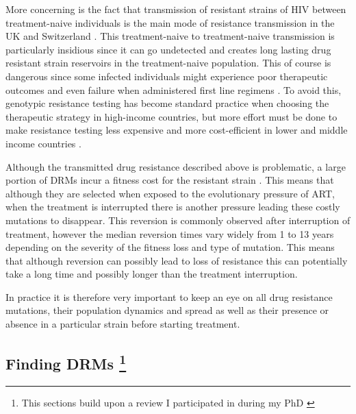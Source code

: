 \documentclass[
  11pt,
  twoside,
  BCOR=10mm,
  listof=totoc]{scrbook}
\begin{document}
More concerning is the fact that transmission of resistant strains of HIV between treatment-naive individuals is the main mode of resistance transmission in the UK \autocite{mouradPhylotypebasedAnalysisHighlights2015,hueDemonstrationSustainedDrugResistant2009} and Switzerland \autocite{drescherTreatmentNaiveIndividualsAre2014}. This treatment-naive to treatment-naive transmission is particularly insidious since it can go undetected and creates long lasting drug resistant strain reservoirs in the treatment-naive population. This of course is dangerous since some infected individuals might experience poor therapeutic outcomes and even failure when administered first line regimens \autocite{boermaHighLevelsPretreatment2016}. To avoid this, genotypic resistance testing has become standard practice when choosing the therapeutic strategy in high-income countries, but more effort must be done to make resistance testing less expensive and more cost-efficient in lower and middle income countries \autocite{clutterHIV1DrugResistance2016}.

Although the transmitted drug resistance described above is problematic, a large portion of DRMs incur a fitness cost for the resistant strain \autocite{kuhnertQuantifyingFitnessCost2018,mespledeViralFitnessCost2013}. This means that although they are selected when exposed to the evolutionary pressure of ART, when the treatment is interrupted there is another pressure leading these costly mutations to disappear. This reversion is commonly observed after interruption of treatment, however the median reversion times vary widely from 1 to 13 years \autocite{castroPersistenceHIV1Transmitted2013} depending on the severity of the fitness loss and type of mutation. This means that although reversion can possibly lead to loss of resistance this can potentially take a long time and possibly longer than the treatment interruption.

In practice it is therefore very important to keep an eye on all drug resistance mutations, their population dynamics and spread as well as their presence or absence in a particular strain before starting treatment.

\hypertarget{finding-drms}{%
\subsection[Finding DRMs ]{\texorpdfstring{Finding DRMs \footnote{This sections build upon a review I participated in during my PhD \autocite{blasselDrugResistanceMutations2021}}}{Finding DRMs }}\label{finding-drms}}
\end{document}
